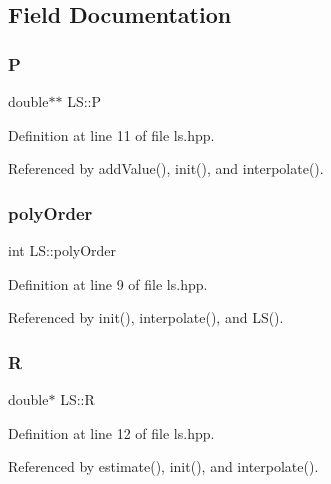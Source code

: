 \subsection{Field Documentation}
\mbox{\label{class_l_s_aef5aafb3950204592111d32c93721aa3}} 
\subsubsection{\texorpdfstring{P}{P}}
{\footnotesize\ttfamily double$\ast$$\ast$ L\+S\+::P\hspace{0.3cm}{\ttfamily [private]}}



Definition at line 11 of file ls.\+hpp.



Referenced by add\+Value(), init(), and interpolate().

\mbox{\label{class_l_s_aecf61c51ef6717acc81b737e298e4236}} 
\subsubsection{\texorpdfstring{poly\+Order}{polyOrder}}
{\footnotesize\ttfamily int L\+S\+::poly\+Order\hspace{0.3cm}{\ttfamily [private]}}



Definition at line 9 of file ls.\+hpp.



Referenced by init(), interpolate(), and L\+S().

\mbox{\label{class_l_s_ade8c978a7d99f10950790c0dfec9f556}} 
\subsubsection{\texorpdfstring{R}{R}}
{\footnotesize\ttfamily double$\ast$ L\+S\+::R\hspace{0.3cm}{\ttfamily [private]}}



Definition at line 12 of file ls.\+hpp.



Referenced by estimate(), init(), and interpolate().

